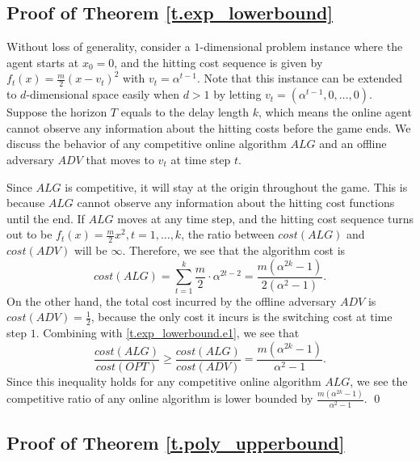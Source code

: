 \subsection{Proof of Theorem \ref{t.exp_lowerbound}}\label{proof.exp}

Without loss of generality, consider a $1$-dimensional problem instance where the agent starts at $x_0 = 0$, and the hitting cost sequence is given by $f_t(x) = \frac{m}{2}(x - v_t)^2$ with $v_t = \alpha^{t-1}$. Note that this instance can be extended to $d$-dimensional space easily when $d > 1$ by letting $v_t = (\alpha^{t-1}, 0, \ldots, 0)$. Suppose the horizon $T$ equals to the delay length $k$, which means the online agent cannot observe any information about the hitting costs before the game ends. We discuss the behavior of any competitive online algorithm $ALG$ and an offline adversary $ADV$ that moves to $v_t$ at time step $t$.

Since $ALG$ is competitive, it will stay at the origin throughout the game. This is because $ALG$ cannot observe any information about the hitting cost functions until the end. If $ALG$ moves at any time step, and the hitting cost sequence turns out to be $f_t(x) = \frac{m}{2}x^2, t = 1, \ldots, k$, the ratio between $cost(ALG)$ and $cost(ADV)$ will be $\infty$. Therefore, we see that the algorithm cost is
\begin{equation}\label{t.exp_lowerbound.e1}
    cost(ALG) = \sum_{t=1}^k \frac{m}{2}\cdot \alpha^{2t-2} = \frac{m(\alpha^{2k} - 1)}{2(\alpha^2 - 1)}.
\end{equation}
On the other hand, the total cost incurred by the offline adversary $ADV$ is $cost(ADV) = \frac{1}{2}$, because the only cost it incurs is the switching cost at time step $1$. Combining with \eqref{t.exp_lowerbound.e1}, we see that
\[\frac{cost(ALG)}{cost(OPT)} \geq \frac{cost(ALG)}{cost(ADV)} = \frac{m(\alpha^{2k} - 1)}{\alpha^2 - 1}.\]
Since this inequality holds for any competitive online algorithm $ALG$, we see the competitive ratio of any online algorithm is lower bounded by $\frac{m(\alpha^{2k} - 1)}{\alpha^2 - 1}$.
\qed

\subsection{Proof of Theorem \ref{t.poly_upperbound}}\label{proof.poly}

